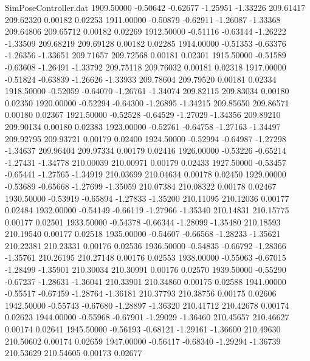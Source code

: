 \begin{filecontents}{SimPoseController.dat}
1909.50000   -0.50642   -0.62677    -1.25951   -1.33226  209.61417  209.62320    0.00182    0.02253
1911.00000   -0.50879   -0.62911    -1.26087   -1.33368  209.64806  209.65712    0.00182    0.02269
1912.50000   -0.51116   -0.63144    -1.26222   -1.33509  209.68219  209.69128    0.00182    0.02285
1914.00000   -0.51353   -0.63376    -1.26356   -1.33651  209.71657  209.72568    0.00181    0.02301
1915.50000   -0.51589   -0.63608    -1.26491   -1.33792  209.75118  209.76032    0.00181    0.02318
1917.00000   -0.51824   -0.63839    -1.26626   -1.33933  209.78604  209.79520    0.00181    0.02334
1918.50000   -0.52059   -0.64070    -1.26761   -1.34074  209.82115  209.83034    0.00180    0.02350
1920.00000   -0.52294   -0.64300    -1.26895   -1.34215  209.85650  209.86571    0.00180    0.02367
1921.50000   -0.52528   -0.64529    -1.27029   -1.34356  209.89210  209.90134    0.00180    0.02383
1923.00000   -0.52761   -0.64758    -1.27163   -1.34497  209.92795  209.93721    0.00179    0.02400
1924.50000   -0.52994   -0.64987    -1.27298   -1.34637  209.96404  209.97334    0.00179    0.02416
1926.00000   -0.53226   -0.65214    -1.27431   -1.34778  210.00039  210.00971    0.00179    0.02433
1927.50000   -0.53457   -0.65441    -1.27565   -1.34919  210.03699  210.04634    0.00178    0.02450
1929.00000   -0.53689   -0.65668    -1.27699   -1.35059  210.07384  210.08322    0.00178    0.02467
1930.50000   -0.53919   -0.65894    -1.27833   -1.35200  210.11095  210.12036    0.00177    0.02484
1932.00000   -0.54149   -0.66119    -1.27966   -1.35340  210.14831  210.15775    0.00177    0.02501
1933.50000   -0.54378   -0.66344    -1.28099   -1.35480  210.18593  210.19540    0.00177    0.02518
1935.00000   -0.54607   -0.66568    -1.28233   -1.35621  210.22381  210.23331    0.00176    0.02536
1936.50000   -0.54835   -0.66792    -1.28366   -1.35761  210.26195  210.27148    0.00176    0.02553
1938.00000   -0.55063   -0.67015    -1.28499   -1.35901  210.30034  210.30991    0.00176    0.02570
1939.50000   -0.55290   -0.67237    -1.28631   -1.36041  210.33901  210.34860    0.00175    0.02588
1941.00000   -0.55517   -0.67459    -1.28764   -1.36181  210.37793  210.38756    0.00175    0.02606
1942.50000   -0.55743   -0.67680    -1.28897   -1.36320  210.41712  210.42678    0.00174    0.02623
1944.00000   -0.55968   -0.67901    -1.29029   -1.36460  210.45657  210.46627    0.00174    0.02641
1945.50000   -0.56193   -0.68121    -1.29161   -1.36600  210.49630  210.50602    0.00174    0.02659
1947.00000   -0.56417   -0.68340    -1.29294   -1.36739  210.53629  210.54605    0.00173    0.02677

\end{filecontents}
